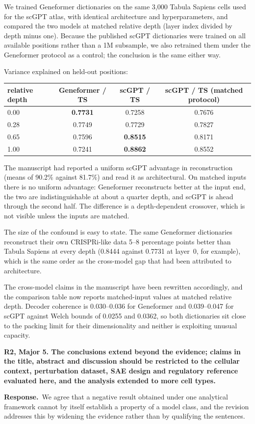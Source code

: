 \documentclass[11pt]{article}
\newcommand{\point}[1]{\vspace{0.7em}\noindent\textbf{#1}\par\vspace{0.15em}}
\newcommand{\reply}{\par\vspace{0.3em}\noindent\textbf{Response.}\ }
\begin{document}
We trained Geneformer dictionaries on the same 3,000 Tabula Sapiens cells used for the scGPT atlas,
with identical architecture and hyperparameters, and compared the two models at matched relative
depth (layer index divided by depth minus one). Because the published scGPT dictionaries were
trained on all available positions rather than a 1M subsample, we also retrained them under the
Geneformer protocol as a control; the conclusion is the same either way.

Variance explained on held-out positions:

\begin{center}
\begin{tabular}{lccc}
\hline
relative depth & Geneformer / TS & scGPT / TS & scGPT / TS (matched protocol) \\
\hline
0.00 & \textbf{0.7731} & 0.7258 & 0.7676 \\
0.28 & 0.7749 & 0.7729 & 0.7827 \\
0.65 & 0.7596 & \textbf{0.8515} & 0.8171 \\
1.00 & 0.7241 & \textbf{0.8862} & 0.8552 \\
\hline
\end{tabular}
\end{center}

The manuscript had reported a uniform scGPT advantage in reconstruction (means of 90.2\% against
81.7\%) and read it as architectural. On matched inputs there is no uniform advantage: Geneformer
reconstructs better at the input end, the two are indistinguishable at about a quarter depth, and
scGPT is ahead through the second half. The difference is a depth-dependent crossover, which is not
visible unless the inputs are matched.

The size of the confound is easy to state. The same Geneformer dictionaries reconstruct their own
CRISPRi-like data 5--8 percentage points better than Tabula Sapiens at every depth (0.8444 against
0.7731 at layer~0, for example), which is the same order as the cross-model gap that had been
attributed to architecture.

The cross-model claims in the manuscript have been rewritten accordingly, and the comparison table
now reports matched-input values at matched relative depth. Decoder coherence is 0.030--0.036 for
Geneformer and 0.039--0.047 for scGPT against Welch bounds of 0.0255 and 0.0362, so both
dictionaries sit close to the packing limit for their dimensionality and neither is exploiting
unusual capacity.

\point{R2, Major 5. The conclusions extend beyond the evidence; claims in the title, abstract and
discussion should be restricted to the cellular context, perturbation dataset, SAE design and
regulatory reference evaluated here, and the analysis extended to more cell types.}
\reply We agree that a negative result obtained under one analytical framework cannot by itself establish
a property of a model class, and the revision addresses this by widening the evidence rather than
by qualifying the sentences.
\end{document}
